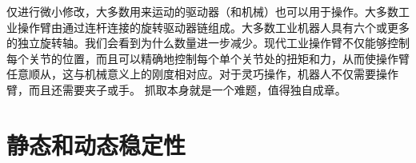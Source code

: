 仅进行微小修改，大多数用来运动的驱动器（和机械）也可以用于操作。大多数工业操作臂由通过连杆连接的旋转驱动器链组成。大多数工业机器人具有六个或更多的独立旋转轴。我们会看到为什么数量进一步减少。现代工业操作臂不仅能够控制每个关节的位置，而且可以精确地控制每个单个关节处的扭矩和力，从而使操作臂任意顺从，这与机械意义上的刚度相对应。对于灵巧操作，机器人不仅需要操作臂，而且还需要夹子或手。 抓取本身就是一个难题，值得独自成章。


\section{静态和动态稳定性}\label{sec:stability}


